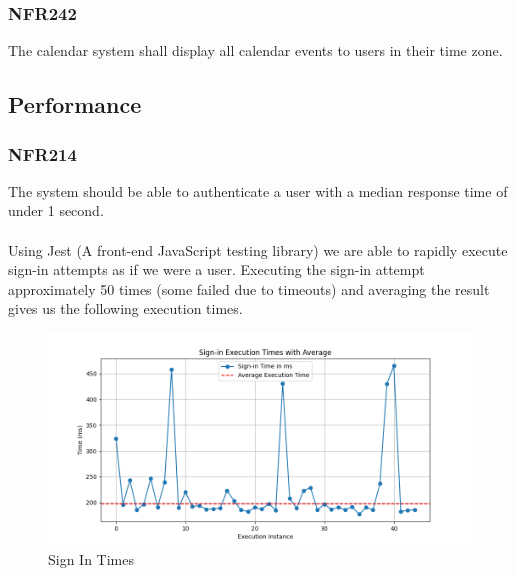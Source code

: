 \documentclass[12pt, titlepage]{article}
\begin{document}
\subsubsection{NFR242}
The calendar system shall display all calendar events to users in
their time zone.
\renewcommand{\arraystretch}{1.5}
\begin{center}
\end{center}

\subsection{Performance}
\subsubsection{NFR214}
The system should be able to authenticate a user with a median
response time of under 1 second.\\\\Using Jest (A front-end JavaScript testing library) we are able to rapidly execute sign-in attempts as if we were a user. Executing the sign-in attempt approximately 50 times (some failed due to timeouts) and averaging the result gives us the following execution times.


\begin{figure}[H]
    \includegraphics[width=\linewidth]{./imgs/signinTimes.png}
    \caption{Sign In Times}
    \label{fig: Sign In Time Diagram}
\end{figure}
\end{document}
